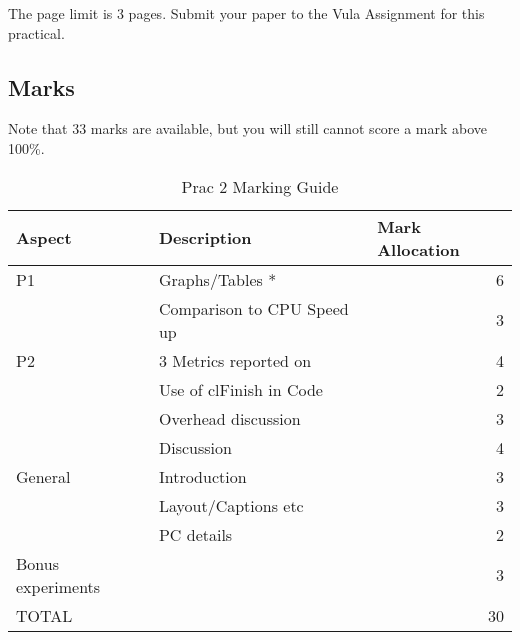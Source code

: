 The page limit is 3 pages. Submit your paper to the Vula Assignment for this practical.

\subsection{Marks}
Note that 33 marks are available, but you will still cannot score a mark above 100\%.
\begin{table}[H]
\centering
\caption{Prac 2 Marking Guide}
\label{tbl:Prac2Marks}
\begin{tabular}{|l|l|r|}
\hline
\textbf{Aspect} & \textbf{Description} & \multicolumn{1}{l|}{\textbf{Mark Allocation}} \\ \hline
P1 & Graphs/Tables * & 6 \\ \hline
 & Comparison to CPU Speed up & 3 \\ \hline
P2 & 3 Metrics reported on & 4 \\ \hline
 & Use of clFinish in Code & 2 \\ \hline
 & Overhead discussion & 3 \\ \hline
 & Discussion & 4 \\ \hline
General & Introduction & 3 \\ \hline
 & Layout/Captions etc & 3 \\ \hline
 & PC details & 2 \\ \hline
Bonus experiments &  & 3 \\ \hline
TOTAL &  & 30 \\ \hline
\end{tabular}
\end{table}